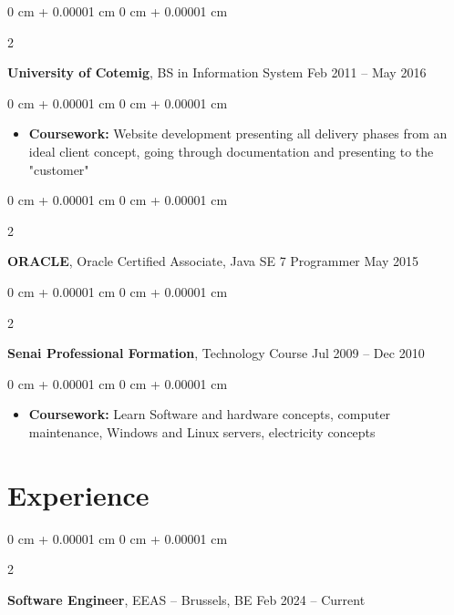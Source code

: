 \documentclass[10pt, letterpaper]{article}
\newenvironment{highlights}{
    \begin{itemize}[
        topsep=0.10 cm,
        parsep=0.10 cm,
        partopsep=0pt,
        itemsep=0pt,
        leftmargin=0 cm + 10pt
    ]
}{
    \end{itemize}
} %
\newenvironment{onecolentry}{
    \begin{adjustwidth}{
        0 cm + 0.00001 cm
    }{
        0 cm + 0.00001 cm
    }
}{
    \end{adjustwidth}
} %
\newenvironment{twocolentry}[2][]{
    \onecolentry
    \def\secondColumn{#2}
    \setcolumnwidth{\fill, 4.5 cm}
    \begin{paracol}{2}
}{
    \switchcolumn \raggedleft \secondColumn
    \end{paracol}
    \endonecolentry
} %
\begin{document}
        
        \begin{twocolentry}{
            Feb 2011 – May 2016
        }
            \textbf{University of Cotemig}, BS in Information System\end{twocolentry}

        \vspace{0.10 cm}
        \begin{onecolentry}
            \begin{highlights}
                \item \textbf{Coursework:} Website development presenting all delivery phases from an ideal client concept, going through documentation and presenting to the "customer"
            \end{highlights}
        \end{onecolentry}

        \vspace{0.15 cm}
        \begin{twocolentry}{
            May 2015
        }
            \textbf{ORACLE}, Oracle Certified Associate, Java SE 7 Programmer\end{twocolentry}
            
        \vspace{0.15 cm}

        \begin{twocolentry}{
            Jul 2009 – Dec 2010
        }
            \textbf{Senai Professional Formation}, Technology Course\end{twocolentry}

        \vspace{0.10 cm}
        \begin{onecolentry}
            \begin{highlights}
                \item \textbf{Coursework:} Learn Software and hardware concepts, computer maintenance, Windows and Linux servers, electricity concepts
            \end{highlights}
        \end{onecolentry}

        
    \section{Experience}

        \begin{twocolentry}{
            Feb 2024 – Current
        }
            \textbf{Software Engineer}, EEAS -- Brussels, BE\end{twocolentry}
\end{document}
